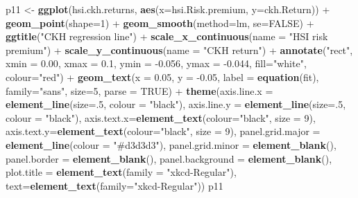 \documentclass[]{article}
\newenvironment{Shaded}{\begin{snugshade}}{\end{snugshade}}
\newcommand{\KeywordTok}[1]{\textcolor[rgb]{0.13,0.29,0.53}{\textbf{{#1}}}}
\newcommand{\DataTypeTok}[1]{\textcolor[rgb]{0.13,0.29,0.53}{{#1}}}
\newcommand{\DecValTok}[1]{\textcolor[rgb]{0.00,0.00,0.81}{{#1}}}
\newcommand{\FloatTok}[1]{\textcolor[rgb]{0.00,0.00,0.81}{{#1}}}
\newcommand{\StringTok}[1]{\textcolor[rgb]{0.31,0.60,0.02}{{#1}}}
\newcommand{\OtherTok}[1]{\textcolor[rgb]{0.56,0.35,0.01}{{#1}}}
\newcommand{\NormalTok}[1]{{#1}}
\begin{document}
\begin{Shaded}
\begin{Highlighting}[]
\NormalTok{p11 <-}\StringTok{ }\KeywordTok{ggplot}\NormalTok{(hsi.ckh.returns, }\KeywordTok{aes}\NormalTok{(}\DataTypeTok{x=}\NormalTok{hsi.Risk.premium, }\DataTypeTok{y=}\NormalTok{ckh.Return)) +}\StringTok{ }\KeywordTok{geom_point}\NormalTok{(}\DataTypeTok{shape=}\DecValTok{1}\NormalTok{) +}\StringTok{ }\KeywordTok{geom_smooth}\NormalTok{(}\DataTypeTok{method=}\NormalTok{lm, }\DataTypeTok{se=}\OtherTok{FALSE}\NormalTok{) +}
\StringTok{      }\KeywordTok{ggtitle}\NormalTok{(}\StringTok{"CKH regression line"}\NormalTok{) +}
\StringTok{      }\KeywordTok{scale_x_continuous}\NormalTok{(}\DataTypeTok{name =} \StringTok{"HSI risk premium"}\NormalTok{) +}
\StringTok{      }\KeywordTok{scale_y_continuous}\NormalTok{(}\DataTypeTok{name =} \StringTok{"CKH return"}\NormalTok{) +}
\StringTok{      }\KeywordTok{annotate}\NormalTok{(}\StringTok{"rect"}\NormalTok{, }\DataTypeTok{xmin =} \FloatTok{0.00}\NormalTok{, }\DataTypeTok{xmax =} \FloatTok{0.1}\NormalTok{, }\DataTypeTok{ymin =} \NormalTok{-}\FloatTok{0.056}\NormalTok{, }\DataTypeTok{ymax =} \NormalTok{-}\FloatTok{0.044}\NormalTok{, }\DataTypeTok{fill=}\StringTok{"white"}\NormalTok{, }\DataTypeTok{colour=}\StringTok{"red"}\NormalTok{) +}\StringTok{ }
\StringTok{      }\KeywordTok{geom_text}\NormalTok{(}\DataTypeTok{x =} \FloatTok{0.05}\NormalTok{, }\DataTypeTok{y =} \NormalTok{-}\FloatTok{0.05}\NormalTok{, }\DataTypeTok{label =} \KeywordTok{equation}\NormalTok{(fit), }\DataTypeTok{family=}\StringTok{"sans"}\NormalTok{, }\DataTypeTok{size=}\DecValTok{5}\NormalTok{, }\DataTypeTok{parse =} \OtherTok{TRUE}\NormalTok{) +}\StringTok{ }
\StringTok{      }\KeywordTok{theme}\NormalTok{(}\DataTypeTok{axis.line.x =} \KeywordTok{element_line}\NormalTok{(}\DataTypeTok{size=}\NormalTok{.}\DecValTok{5}\NormalTok{, }\DataTypeTok{colour =} \StringTok{"black"}\NormalTok{),}
            \DataTypeTok{axis.line.y =} \KeywordTok{element_line}\NormalTok{(}\DataTypeTok{size=}\NormalTok{.}\DecValTok{5}\NormalTok{, }\DataTypeTok{colour =} \StringTok{"black"}\NormalTok{), }
            \DataTypeTok{axis.text.x=}\KeywordTok{element_text}\NormalTok{(}\DataTypeTok{colour=}\StringTok{"black"}\NormalTok{, }\DataTypeTok{size =} \DecValTok{9}\NormalTok{), }
            \DataTypeTok{axis.text.y=}\KeywordTok{element_text}\NormalTok{(}\DataTypeTok{colour=}\StringTok{"black"}\NormalTok{, }\DataTypeTok{size =} \DecValTok{9}\NormalTok{),}
            \DataTypeTok{panel.grid.major =} \KeywordTok{element_line}\NormalTok{(}\DataTypeTok{colour =} \StringTok{"#d3d3d3"}\NormalTok{), }
            \DataTypeTok{panel.grid.minor =} \KeywordTok{element_blank}\NormalTok{(), }
            \DataTypeTok{panel.border =} \KeywordTok{element_blank}\NormalTok{(), }\DataTypeTok{panel.background =} \KeywordTok{element_blank}\NormalTok{(),}
            \DataTypeTok{plot.title =} \KeywordTok{element_text}\NormalTok{(}\DataTypeTok{family =} \StringTok{"xkcd-Regular"}\NormalTok{),}
            \DataTypeTok{text=}\KeywordTok{element_text}\NormalTok{(}\DataTypeTok{family=}\StringTok{"xkcd-Regular"}\NormalTok{))}
\NormalTok{p11}
\end{Highlighting}
\end{Shaded}
\end{document}

